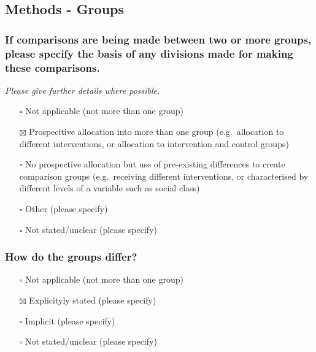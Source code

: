 \documentclass[
  doc, a4paper]{apa7}
\providecommand{\tightlist}{%
  \setlength{\itemsep}{0pt}\setlength{\parskip}{0pt}}
\begin{document}
\subsection{Methods - Groups}\label{methods---groups}

\subsubsection{If comparisons are being made between two or more groups, please specify the basis of any divisions made for making these comparisons.}\label{if-comparisons-are-being-made-between-two-or-more-groups-please-specify-the-basis-of-any-divisions-made-for-making-these-comparisons.}

\emph{Please give further details where possible.}

\begin{itemize}
\tightlist
\item[$\square$]
  Not applicable (not more than one group)\\
\item[$\boxtimes$]
  Prospecitive allocation into more than one group (e.g.~allocation to different interventions, or allocation to intervention and control groups)\\
\item[$\square$]
  No prospective allocation but use of pre-existing differences to create comparison groups (e.g.~receiving different interventions, or characterised by different levels of a variable such as social class)\\
\item[$\square$]
  Other (please specify)\\
\item[$\square$]
  Not stated/unclear (please specify)
\end{itemize}

\subsubsection{How do the groups differ?}\label{how-do-the-groups-differ}

\begin{itemize}
\tightlist
\item[$\square$]
  Not applicable (not more than one group)\\
\item[$\boxtimes$]
  Explicityly stated (please specify)\\
\item[$\square$]
  Implicit (please specify)\\
\item[$\square$]
  Not stated/unclear (please specify)
\end{itemize}
\end{document}
